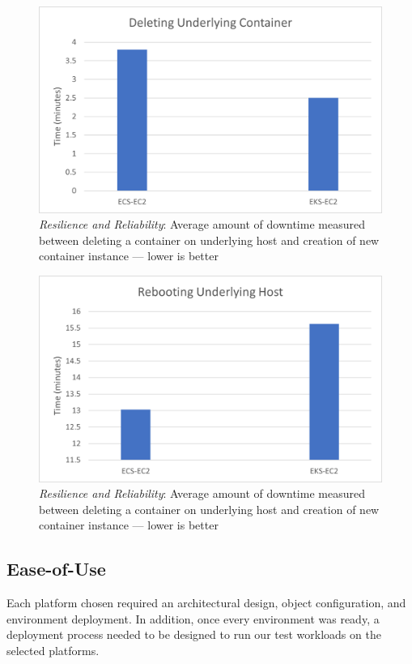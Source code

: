 \begin{figure}[htbp]
  \includegraphics[width=\textwidth]{images/rr-deleteContainer.png}
  \caption{\emph{Resilience and Reliability}: Average amount of downtime measured between deleting a container on underlying host and creation of new container instance --- lower is better}
  \label{fig:rr_deleteContainer}
\end{figure}

\begin{figure}[htbp]
  \includegraphics[width=\textwidth]{images/rr-reboot.png}
  \caption{\emph{Resilience and Reliability}: Average amount of downtime measured between deleting a container on underlying host and creation of new container instance --- lower is better}
  \label{fig:rr_reboot}
\end{figure}


\subsection{Ease-of-Use}
Each platform chosen required an architectural design, object configuration, and environment deployment.
In addition, once every environment was ready, a deployment process needed to be designed to run our test workloads on the selected platforms.

